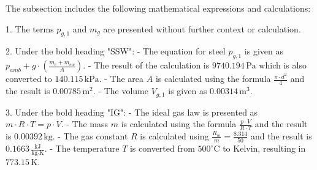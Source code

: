 The subsection includes the following mathematical expressions and calculations:

1. The terms \( p_{g,1} \) and \( m_{g} \) are presented without further context or calculation.

2. Under the bold heading "SSW":
   - The equation for steel \( p_{g,1} \) is given as \( p_{amb} + g \cdot \left( \frac{m_c + m_{ew}}{A} \right) \).
   - The result of the calculation is \( 9740.194 \, \text{Pa} \) which is also converted to \( 140.115 \, \text{kPa} \).
   - The area \( A \) is calculated using the formula \( \frac{\pi \cdot d^2}{4} \) and the result is \( 0.00785 \, \text{m}^2 \).
   - The volume \( V_{g,1} \) is given as \( 0.00314 \, \text{m}^3 \).

3. Under the bold heading "IG":
   - The ideal gas law is presented as \( m \cdot R \cdot T = p \cdot V \).
   - The mass \( m \) is calculated using the formula \( \frac{p \cdot V}{R \cdot T} \) and the result is \( 0.00392 \, \text{kg} \).
   - The gas constant \( R \) is calculated using \( \frac{R_m}{m} = \frac{8.314}{50} \) and the result is \( 0.1663 \, \frac{\text{kJ}}{\text{kg} \cdot \text{K}} \).
   - The temperature \( T \) is converted from \( 500^\circ \text{C} \) to Kelvin, resulting in \( 773.15 \, \text{K} \).